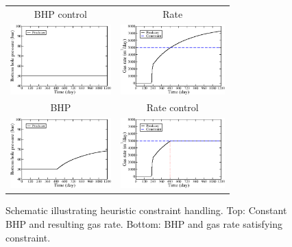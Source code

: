 \documentclass[twocolumn,numbook]{svjour3}          %
\begin{document}
\begin{figure}[ht]
\begin{center}
  \begin{tabular}{cc}
    BHP control & Rate \\
    \includegraphics[height=2.7cm]{SimpleBHP_BHP.pdf}
    &
    \includegraphics[height=2.7cm]{SimpleBHP_rate_gas.pdf} \\
    BHP & Rate control \\
    \includegraphics[height=2.7cm]{SimpleRate_BHP.pdf}
    &
    \includegraphics[height=2.7cm]{SimpleRate_rate_gas.pdf} \\
  \end{tabular}
\end{center}
     \caption{Schematic illustrating heuristic constraint handling. Top: Constant BHP and resulting gas rate. Bottom: BHP and gas rate satisfying constraint.}
\label{fig:BHPvsRateControl}
\end{figure}
\end{document}
